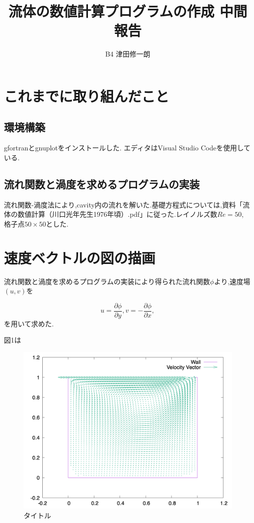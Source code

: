 \documentclass[upLaTeX,a4paper]{jsarticle}
\title{流体の数値計算プログラムの作成 中間報告}
\author{B4 津田修一朗}
\date{}
\begin{document}
\maketitle

\section{これまでに取り組んだこと}
\subsection{環境構築}
gfortranとgnuplotをインストールした.
エディタはVisual Studio Codeを使用している.

\subsection{流れ関数と渦度を求めるプログラムの実装}
流れ関数-渦度法により,cavity内の流れを解いた.基礎方程式については,資料「流体の数値計算（川口光年先生1976年頃）.pdf」に従った.レイノルズ数$Re = 50$, 格子点$50\times 50$とした.

\section{速度ベクトルの図の描画}
流れ関数と渦度を求めるプログラムの実装により得られた流れ関数$\phi$より,速度場$(u, v)$を

\begin{equation}
  u = \frac{\partial \phi}{\partial y}, v = - \frac{\partial \phi}{\partial x},
\end{equation}
を用いて求めた.

図1は
\begin{figure}[htbp]
  \begin{center}
    \includegraphics[width=15cm]{outputs/img/velocity_vector.png}
  \end{center}
  \caption{タイトル}
  \label{picture}
\end{figure}
\end{document}
